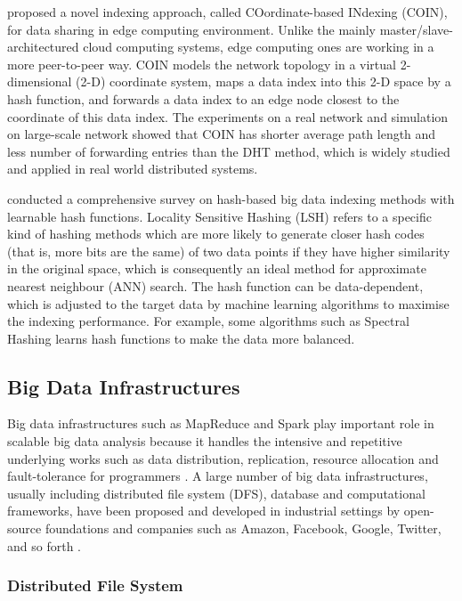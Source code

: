 \documentclass[conference]{IEEEtran}
\begin{document}
\textcite{xie2019} proposed a novel indexing approach, called
COordinate-based INdexing (COIN), for data sharing in edge computing
environment. Unlike the mainly master/slave-architectured cloud
computing systems, edge computing ones are working in a more
peer-to-peer way. COIN models the network topology in a virtual
2-dimensional (2-D) coordinate system, maps a data index into this 2-D
space by a hash function, and forwards a data index to an edge node
closest to the coordinate of this data index. The experiments on a real
network and simulation on large-scale network showed that COIN has
shorter average path length and less number of forwarding entries than
the DHT method, which is widely studied and applied in real world
distributed systems.

\textcite{Wang_2016} conducted a comprehensive survey on hash-based big
data indexing methods with learnable hash functions. Locality Sensitive
Hashing (LSH) refers to a specific kind of hashing methods which are
more likely to generate closer hash codes (that is, more bits are the
same) of two data points if they have higher similarity in the original
space, which is consequently an ideal method for approximate nearest
neighbour (ANN) search. The hash function can be data-dependent, which
is adjusted to the target data by machine learning algorithms to
maximise the indexing performance. For example, some algorithms such as
Spectral Hashing learns hash functions to make the data more balanced.

\hypertarget{big-data-infrastructures}{%
\subsection{Big Data Infrastructures}\label{big-data-infrastructures}}

Big data infrastructures such as MapReduce and Spark play important role
in scalable big data analysis because it handles the intensive and
repetitive underlying works such as data distribution, replication,
resource allocation and fault-tolerance for programmers
\autocite{Gupta2016}. A large number of big data infrastructures,
usually including distributed file system (DFS), database and
computational frameworks, have been proposed and developed in industrial
settings by open-source foundations and companies such as Amazon,
Facebook, Google, Twitter, and so forth \autocite{Gupta2016,Hewage2018}.

\hypertarget{distributed-file-system}{%
\subsubsection{Distributed File System}\label{distributed-file-system}}
\end{document}
